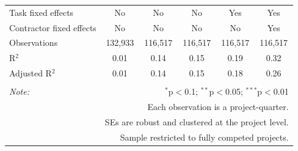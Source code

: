 \documentclass[
]{article}
\begin{document}
\begin{table}[H]
\begin{tabular}{@{\extracolsep{-2pt}}lccccc}
Task fixed effects & No & No & No & Yes & Yes \\ 
Contractor fixed effects & No & No & No & No & Yes \\ 
Observations & 132,933 & 116,517 & 116,517 & 116,517 & 116,517 \\ 
R$^{2}$ & 0.01 & 0.14 & 0.15 & 0.19 & 0.32 \\ 
Adjusted R$^{2}$ & 0.01 & 0.14 & 0.15 & 0.18 & 0.26 \\ 
\hline 
\hline \\[-1.8ex] 
\textit{Note:}  & \multicolumn{5}{r}{$^{*}$p$<$0.1; $^{**}$p$<$0.05; $^{***}$p$<$0.01} \\ 
 & \multicolumn{5}{r}{Each observation is a project-quarter.} \\ 
 & \multicolumn{5}{r}{SEs are robust and clustered at the project level.} \\ 
 & \multicolumn{5}{r}{Sample restricted to fully competed projects.} \\ 
\end{tabular} 
\end{table}
\end{document}
